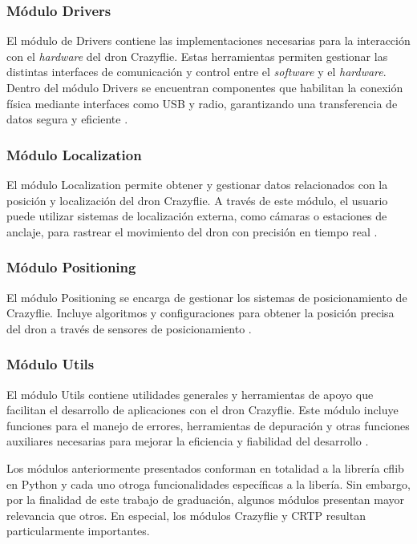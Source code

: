 \subsubsection{Módulo Drivers}
El módulo de Drivers contiene las implementaciones necesarias para la interacción con el \textit{hardware} del dron Crazyflie. Estas herramientas permiten gestionar las distintas interfaces de comunicación y control entre el \textit{software} y el \textit{hardware}. Dentro del módulo Drivers se encuentran componentes que habilitan la conexión física mediante interfaces como USB y radio, garantizando una transferencia de datos segura y eficiente \cite{Drivers}.

\subsubsection{Módulo Localization}
El módulo Localization permite obtener y gestionar datos relacionados con la posición y localización del dron Crazyflie. A través de este módulo, el usuario puede utilizar sistemas de localización externa, como cámaras o estaciones de anclaje, para rastrear el movimiento del dron con precisión en tiempo real \cite{Localization}.

\subsubsection{Módulo Positioning}
El módulo Positioning se encarga de gestionar los sistemas de posicionamiento de Crazyflie. Incluye algoritmos y configuraciones para obtener la posición precisa del dron a través de sensores de posicionamiento \cite{Positioning}.

\subsubsection{Módulo Utils}
El módulo Utils contiene utilidades generales y herramientas de apoyo que facilitan el desarrollo de aplicaciones con el dron Crazyflie. Este módulo incluye funciones para el manejo de errores, herramientas de depuración y otras funciones auxiliares necesarias para mejorar la eficiencia y fiabilidad del desarrollo \cite{Utils}.

\vspace{0.5cm} %
Los módulos anteriormente presentados conforman en totalidad a la librería cflib en Python y cada uno otroga funcionalidades específicas a la libería. Sin embargo, por la finalidad de este trabajo de graduación, algunos módulos presentan mayor relevancia que otros. En especial, los módulos Crazyflie y CRTP resultan particularmente importantes.

